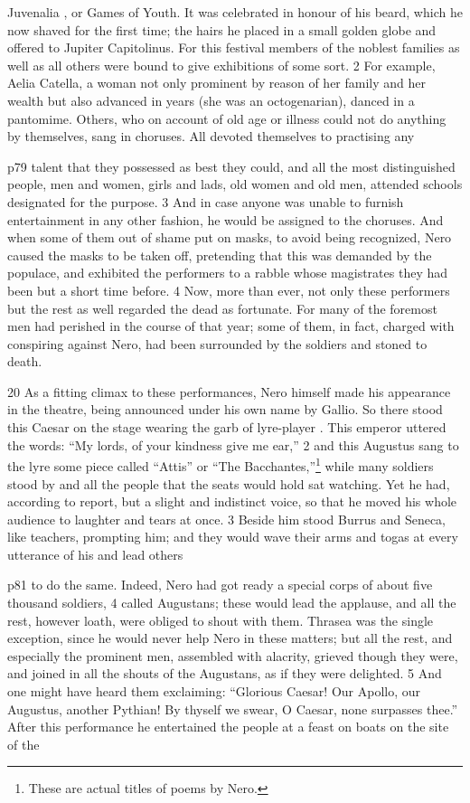 Juvenalia , or Games of Youth. It was celebrated in honour of his beard, which he now shaved for the first time; the hairs he placed in a small golden globe and offered to Jupiter Capitolinus. For this festival members of the noblest families as well as all others were bound to give exhibitions of some sort. 2 For example, Aelia Catella, a woman not only prominent by reason of her family and her wealth but also advanced in years (she was an octogenarian), danced in a pantomime. Others, who on account of old age or illness could not do anything by themselves, sang in choruses. All devoted themselves to practising any

p79 talent that they possessed as best they could, and all the most distinguished people, men and women, girls and lads, old women and old men, attended schools designated for the purpose. 3 And in case anyone was unable to furnish entertainment in any other fashion, he would be assigned to the choruses. And when some of them out of shame put on masks, to avoid being recognized, Nero caused the masks to be taken off, pretending that this was demanded by the populace, and exhibited the performers to a rabble whose magistrates they had been but a short time before. 4 Now, more than ever, not only these performers but the rest as well regarded the dead as fortunate. For many of the foremost men had perished in the course of that year; some of them, in fact, charged with conspiring against Nero, had been surrounded by the soldiers and stoned to death.

20
As a fitting climax to these performances, Nero himself made his appearance in the theatre, being announced under his own name by Gallio. So there stood this Caesar on the stage wearing the garb of lyre-player . This emperor uttered the words: ``My lords, of your kindness give me ear,'' 2 and this Augustus sang to the lyre some piece called ``Attis'' or ``The Bacchantes,''\texthebrew{⁠}\footnote{These are actual titles of poems by Nero.

} while many soldiers stood by and all the people that the seats would hold sat watching. Yet he had, according to report, but a slight and indistinct voice, so that he moved his whole audience to laughter and tears at once. 3 Beside him stood Burrus and Seneca, like teachers, prompting him; and they would wave their arms and togas at every utterance of his and lead others

p81 to do the same. Indeed, Nero had got ready a special corps of about five thousand soldiers, 4 called Augustans; these would lead the applause, and all the rest, however loath, were obliged to shout with them. Thrasea was the single exception, since he would never help Nero in these matters; but all the rest, and especially the prominent men, assembled with alacrity, grieved though they were, and joined in all the shouts of the Augustans, as if they were delighted. 5 And one might have heard them exclaiming: ``Glorious Caesar! Our Apollo, our Augustus, another Pythian! By thyself we swear, O Caesar, none surpasses thee.'' After this performance he entertained the people at a feast on boats on the site of the

